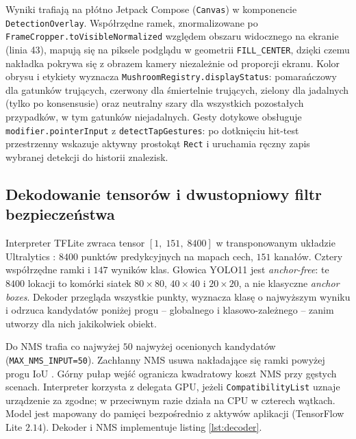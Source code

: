 Wyniki trafiają na płótno Jetpack Compose (\texttt{Canvas}) w komponencie \texttt{DetectionOverlay}. Współrzędne ramek, znormalizowane po \texttt{FrameCropper.toVisibleNormalized} względem obszaru widocznego na ekranie (linia 43), mapują się na piksele podglądu w geometrii \texttt{FILL\_CENTER}, dzięki czemu nakładka pokrywa się z obrazem kamery niezależnie od proporcji ekranu. Kolor obrysu i etykiety wyznacza \texttt{MushroomRegistry.displayStatus}: pomarańczowy dla gatunków trujących, czerwony dla śmiertelnie trujących, zielony dla jadalnych (tylko po konsensusie) oraz neutralny szary dla wszystkich pozostałych przypadków, w tym gatunków niejadalnych. Gesty dotykowe obsługuje \texttt{modifier.pointerInput} z \texttt{detectTapGestures}: po dotknięciu hit-test przestrzenny wskazuje aktywny prostokąt \texttt{Rect} i uruchamia ręczny zapis wybranej detekcji do historii znalezisk.

\subsection{Dekodowanie tensorów i dwustopniowy filtr bezpieczeństwa}
Interpreter TFLite zwraca tensor $[1,\;151,\;8400]$ w transponowanym układzie Ultralytics \cite{ultralytics2024yolo11}: $8400$ punktów predykcyjnych na mapach cech, $151$ kanałów. Cztery współrzędne ramki i $147$ wyników klas. Głowica YOLO11 jest \textit{anchor-free}: te $8400$ lokacji to komórki siatek $80{\times}80$, $40{\times}40$ i $20{\times}20$, a nie klasyczne \textit{anchor boxes}. Dekoder przegląda wszystkie punkty, wyznacza klasę o najwyższym wyniku i odrzuca kandydatów poniżej progu – globalnego i klasowo-zależnego – zanim utworzy dla nich jakikolwiek obiekt.

Do NMS trafia co najwyżej $50$ najwyżej ocenionych kandydatów (\texttt{MAX\_NMS\_INPUT=50}). Zachłanny NMS usuwa nakładające się ramki powyżej progu IoU \cite{redmon2016yolo}. Górny pułap wejść ogranicza kwadratowy koszt NMS przy gęstych scenach. Interpreter korzysta z delegata GPU, jeżeli \texttt{CompatibilityList} uznaje urządzenie za zgodne; w przeciwnym razie działa na CPU w czterech wątkach. Model jest mapowany do pamięci bezpośrednio z aktywów aplikacji (TensorFlow Lite $2.14$). Dekoder i NMS implementuje listing \ref{lst:decoder}.

